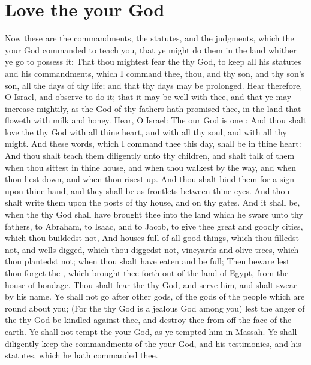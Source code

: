 \section*{Love the \LORD your God}
\begin{biblechapter} %
\verse Now these are the commandments, the statutes, and the judgments, which the \LORD your God commanded to teach you, that ye might do them in the land whither ye go to possess it:
\verse That thou mightest fear the \LORD thy God, to keep all his statutes and his commandments, which I command thee, thou, and thy son, and thy son's son, all the days of thy life; and that thy days may be prolonged.
\verse Hear therefore, O Israel, and observe to do it; that it may be well with thee, and that ye may increase mightily, as the \LORD God of thy fathers hath promised thee, in the land that floweth with milk and honey.
\verse Hear, O Israel: The \LORD our God is one \LORD:
\verse And thou shalt love the \LORD thy God with all thine heart, and with all thy soul, and with all thy might.
\verse And these words, which I command thee this day, shall be in thine heart:
\verse And thou shalt teach them diligently unto thy children, and shalt talk of them when thou sittest in thine house, and when thou walkest by the way, and when thou liest down, and when thou risest up.
\verse And thou shalt bind them for a sign upon thine hand, and they shall be as frontlets between thine eyes.
\verse And thou shalt write them upon the posts of thy house, and on thy gates.
\verse And it shall be, when the \LORD thy God shall have brought thee into the land which he sware unto thy fathers, to Abraham, to Isaac, and to Jacob, to give thee great and goodly cities, which thou buildedst not,
\verse And houses full of all good things, which thou filledst not, and wells digged, which thou diggedst not, vineyards and olive trees, which thou plantedst not; when thou shalt have eaten and be full;
\verse Then beware lest thou forget the \LORD, which brought thee forth out of the land of Egypt, from the house of bondage.
\verse Thou shalt fear the \LORD thy God, and serve him, and shalt swear by his name.
\verse Ye shall not go after other gods, of the gods of the people which are round about you;
\verse (For the \LORD thy God is a jealous God among you) lest the anger of the \LORD thy God be kindled against thee, and destroy thee from off the face of the earth.
\verse Ye shall not tempt the \LORD your God, as ye tempted him in Massah.
\verse Ye shall diligently keep the commandments of the \LORD your God, and his testimonies, and his statutes, which he hath commanded thee.

\end{biblechapter}
